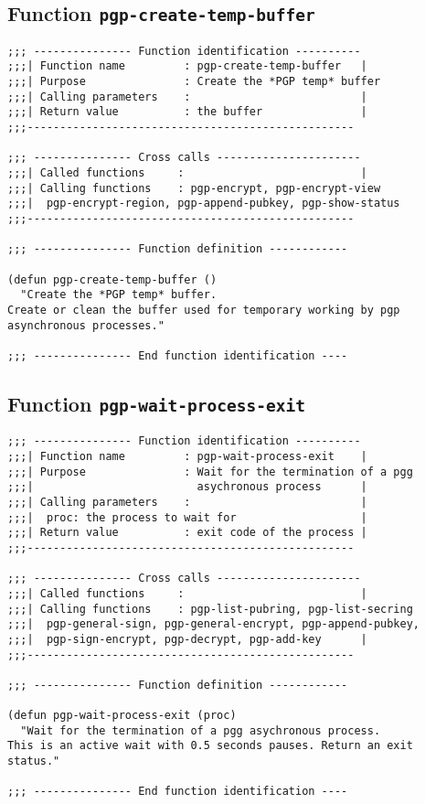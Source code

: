 \subsection{Function {\tt pgp-create-temp-buffer}}
\leavevmode
\begin{verbatim}
;;; --------------- Function identification ----------
;;;| Function name         : pgp-create-temp-buffer   |
;;;| Purpose               : Create the *PGP temp* buffer
;;;| Calling parameters    :                          |
;;;| Return value          : the buffer               |
;;;--------------------------------------------------

;;; --------------- Cross calls ----------------------
;;;| Called functions     :                           |
;;;| Calling functions    : pgp-encrypt, pgp-encrypt-view
;;;|  pgp-encrypt-region, pgp-append-pubkey, pgp-show-status
;;;--------------------------------------------------

;;; --------------- Function definition ------------

(defun pgp-create-temp-buffer ()
  "Create the *PGP temp* buffer.
Create or clean the buffer used for temporary working by pgp
asynchronous processes."

;;; --------------- End function identification ----
\end{verbatim}
\subsection{Function {\tt pgp-wait-process-exit}}
\leavevmode
\begin{verbatim}
;;; --------------- Function identification ----------
;;;| Function name         : pgp-wait-process-exit    |
;;;| Purpose               : Wait for the termination of a pgg
;;;|                         asychronous process      |
;;;| Calling parameters    :                          |
;;;|  proc: the process to wait for                   |
;;;| Return value          : exit code of the process |
;;;--------------------------------------------------

;;; --------------- Cross calls ----------------------
;;;| Called functions     :                           |
;;;| Calling functions    : pgp-list-pubring, pgp-list-secring
;;;|  pgp-general-sign, pgp-general-encrypt, pgp-append-pubkey,
;;;|  pgp-sign-encrypt, pgp-decrypt, pgp-add-key      |
;;;--------------------------------------------------

;;; --------------- Function definition ------------

(defun pgp-wait-process-exit (proc)
  "Wait for the termination of a pgg asychronous process.
This is an active wait with 0.5 seconds pauses. Return an exit status."

;;; --------------- End function identification ----
\end{verbatim}
